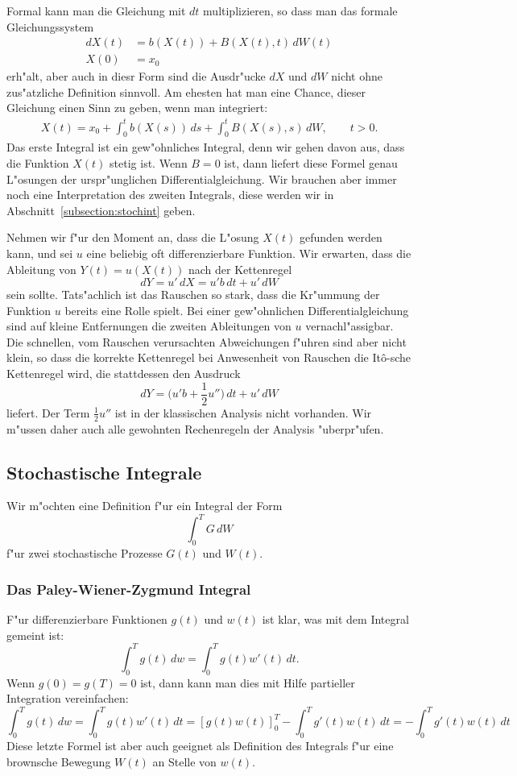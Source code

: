 Formal kann man die Gleichung mit $dt$ multiplizieren, so dass man
das formale Gleichungssystem
\begin{align*}
dX(t)
&=
b(X(t)) + B(X(t),t)\,dW(t)
\\
X(0)
&=
x_0
\end{align*}
erh"alt, aber auch in diesr Form sind die Ausdr"ucke $dX$ und $dW$ nicht
ohne zus"atzliche Definition sinnvoll.
Am ehesten hat man eine Chance, dieser Gleichung einen Sinn zu geben,
wenn man integriert:
\begin{align*}
X(t)=x_0+\int_0^t b(X(s))\,ds + \int_0^t B(X(s), s)\, dW,\qquad t>0.
\end{align*}
Das erste Integral ist ein gew"ohnliches Integral, denn wir
gehen davon aus, dass die Funktion $X(t)$ stetig ist.
Wenn $B=0$ ist, dann liefert diese Formel genau L"osungen der
urspr"unglichen Differentialgleichung.
Wir brauchen aber immer noch eine Interpretation des zweiten Integrals,
diese werden wir in Abschnitt~\ref{subsection:stochint} geben.

Nehmen wir f"ur den Moment an, dass die L"osung $X(t)$ gefunden werden
kann, und sei $u$ eine beliebig oft differenzierbare Funktion.
Wir erwarten, dass die Ableitung von $Y(t)=u(X(t))$ nach der
Kettenregel
\[
dY = u'\,dX = u'b\,dt + u'\,dW
\]
sein sollte.
Tats"achlich ist das Rauschen so stark, dass die Kr"ummung der Funktion
$u$ bereits eine Rolle spielt.
Bei einer gew"ohnlichen Differentialgleichung sind auf kleine Entfernungen
die zweiten Ableitungen von $u$ vernachl"assigbar.
Die schnellen, vom Rauschen verursachten Abweichungen f"uhren sind aber nicht
klein, so dass die korrekte Kettenregel bei Anwesenheit von Rauschen die
It\^o-sche Kettenregel wird, die stattdessen den Ausdruck
\[
dY =  \biggl(u'b + \frac12u''\biggr)\,dt + u'\,dW
\]
liefert.
Der Term $\frac12u''$ ist in der klassischen Analysis nicht vorhanden.
Wir m"ussen daher auch alle gewohnten Rechenregeln der Analysis "uberpr"ufen.

\subsection{Stochastische Integrale\label{subsection:stochint}}
Wir m"ochten eine Definition f"ur ein Integral der Form
\[
\int_0^T G\,dW
\]
f"ur zwei stochastische Prozesse $G(t)$ und $W(t)$.

\subsubsection{Das Paley-Wiener-Zygmund Integral}
F"ur differenzierbare Funktionen $g(t)$ und $w(t)$ ist klar, was 
mit dem Integral gemeint ist:
\[
\int_0^T g(t)\,dw = \int_0^T g(t) w'(t)\,dt.
\]
Wenn $g(0)=g(T)=0$ ist, dann kann man dies mit Hilfe partieller Integration
vereinfachen:
\[
\int_0^T g(t)\,dw
=
\int_0^T g(t) w'(t)\,dt
=
[g(t)w(t)]_0^T
-
\int_0^T g'(t) w(t)\,dt
=
-\int_0^T g'(t) w(t)\,dt
\]
Diese letzte Formel ist aber auch geeignet als Definition des Integrals
f"ur eine brownsche Bewegung $W(t)$ an Stelle von $w(t)$.

